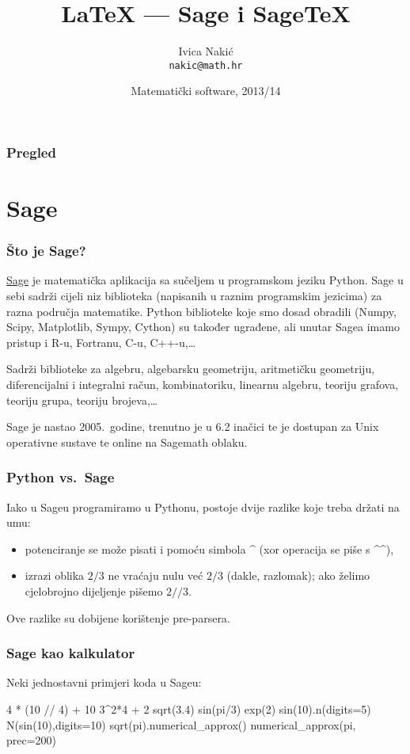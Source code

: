 \documentclass{beamer}
\title{\LaTeX{} --- Sage i Sage\TeX}
\subtitle{}
\author{Ivica Nakić \\ \texttt{nakic@math.hr}}
\institute[PMF--MO]{Matematički odsjek Prirodoslovno--matematičkog fakulteta}
\date[2013/14]{Matematički software, 2013/14}
\begin{document}
\begin{frame}
  \maketitle  
\end{frame}

\begin{frame}
\frametitle{Pregled}
  \tableofcontents  
\end{frame}

\section{Sage}

\begin{frame}
\frametitle{Što je Sage?}
\href{http://www.sagemath.org}{Sage} je matematička aplikacija sa sučeljem u programskom jeziku Python. Sage u sebi sadrži cijeli niz biblioteka (napisanih u raznim programskim jezicima) za razna područja matematike. Python biblioteke koje smo dosad obradili (Numpy, Scipy, Matplotlib, Sympy, Cython) su također ugrađene, ali unutar Sagea imamo pristup i R-u, Fortranu, C-u, C++-u,\ldots   
\pause

Sadrži biblioteke za algebru, algebarsku geometriju, aritmetičku geometriju, diferencijalni i integralni račun, kombinatoriku, linearnu algebru, teoriju grafova, teoriju grupa, teoriju brojeva,\ldots
\pause

Sage je nastao 2005.\ godine, trenutno je u 6.2 inačici te je dostupan za Unix operativne sustave te online na Sagemath oblaku.
\end{frame}

\begin{frame}
\frametitle{Python vs.\ Sage}
Iako u Sageu programiramo u Pythonu, postoje dvije razlike koje treba držati na umu:
\begin{itemize}
     \item potenciranje se može pisati i pomoću simbola \textasciicircum{} (xor operacija se piše s \textasciicircum\textasciicircum),
     \item izrazi oblika $2/3$ ne vraćaju nulu već $2/3$ (dakle, razlomak); ako želimo cjelobrojno dijeljenje pišemo $2//3$.
   \end{itemize}   
Ove razlike su dobijene korištenje pre-parsera.

\end{frame}

\begin{frame}[fragile]
\frametitle{Sage kao kalkulator}
Neki jednostavni primjeri koda u Sageu:

\begin{sageblock}
4 * (10 // 4) + 10 %
3^2*4 + 2%
sqrt(3.4)
sin(pi/3)
exp(2)
sin(10).n(digits=5)
N(sin(10),digits=10)
sqrt(pi).numerical_approx()
numerical_approx(pi, prec=200)
\end{sageblock}

\end{frame}
\end{document}
